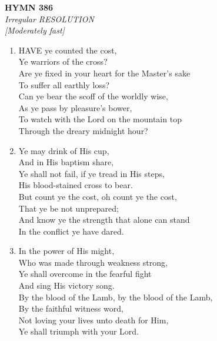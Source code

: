 \documentclass[11pt,a4paper]{article}
\begin{document}
\newpage
\begin{center}
    {\Large \textbf{HYMN 386}}
    \\
    \textit{Irregular RESOLUTION}
    \\
    \textit{\small [Moderately fast]}
\end{center}
\vspace{1em}

\begin{enumerate}
    \item HAVE ye counted the cost, \\
        Ye warriors of the cross? \\
        Are ye fixed in your heart for the Master's sake \\
        To suffer all earthly loss? \\
        Can ye bear the scoff of the worldly wise, \\
        As ye pass by pleasure's bower, \\
        To watch with the Lord on the mountain top \\
        Through the dreary midnight hour?

    \item Ye may drink of His cup, \\
        And in His baptism share, \\
        Ye shall not fail, if ye tread in His steps, \\
        His blood-stained cross to bear. \\
        But count ye the cost, oh count ye the cost, \\
        That ye be not unprepared; \\
        And know ye the strength that alone can stand \\
        In the conflict ye have dared.

    \item In the power of His might, \\
        Who was made through weakness strong, \\
        Ye shall overcome in the fearful fight \\
        And sing His victory song. \\
        By the blood of the Lamb, by the blood of the Lamb, \\
        By the faithful witness word, \\
        Not loving your lives unto death for Him, \\
        Ye shall triumph with your Lord.


\end{enumerate}
\end{document}
